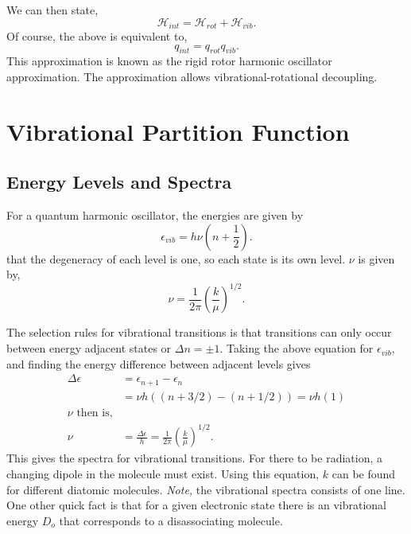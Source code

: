 We can then state,
\begin{equation*}
	\mathcal{H}_{int} = \mathcal{H}_{rot} + \mathcal{H}_{vib}.
\end{equation*}
Of course, the above is equivalent to,
\begin{equation*}
	q_{int} = q_{rot}q_{vib}.
\end{equation*}
This approximation is known as the rigid rotor harmonic oscillator
approximation. The approximation allows vibrational-rotational decoupling.

\section{Vibrational Partition Function}%
\label{sec:vib}
\subsection{Energy Levels and Spectra}
For a quantum harmonic oscillator, the energies are given by
\begin{equation*}
	\epsilon_{vib} = h\nu(n+ \frac{1}{2}).
\end{equation*}
\note that the degeneracy of each level is one, so each state is its
own level. $\nu$ is given by,
\begin{equation*}
	\nu = \frac{1}{2\pi} \left(\frac{k}{\mu}\right)^{1/2}.
\end{equation*}

The selection rules for vibrational transitions is that transitions can only
occur between energy adjacent states or $\Delta n = \pm 1$. Taking the above
equation for $\epsilon_{vib}$, and finding the energy difference between
adjacent levels gives
\begin{align*}
	\Delta\epsilon &= \epsilon_{n+1} - \epsilon_{n}\\
				   &= \nu h ((n + 3/2) - (n + 1/2)) = \nu h (1)\\
				   \nu\text{ then is,}\\
	\nu &= \frac{\Delta\epsilon}{h} =
	\frac{1}{2\pi}\left(\frac{k}{\mu}\right)^{1/2}.
\end{align*}
This gives the spectra for vibrational transitions. For there to be radiation, a
changing dipole in the molecule must exist. Using this equation, $k$ can be
found for different diatomic molecules. \textit{Note,} the vibrational spectra
consists of one line. One other quick fact is that for a given electronic state
there is an vibrational energy $D_o$ that corresponds to a disassociating
molecule.

